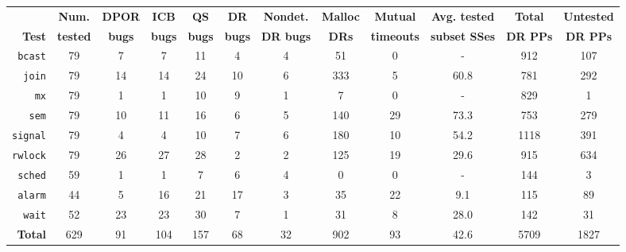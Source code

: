 
\begin{table}[t]
	\begin{center}
		\small
	\begin{tabular}{r|c||c|c|c|c|c|c||c|c||c|c}
		& {\bf Num.} & {\bf DPOR} & {\bf ICB} & {\bf QS} & {\bf DR} & {\bf Nondet.} & {\bf Malloc} & {\bf Mutual} & {\bf Avg. tested} & {\bf Total} & {\bf Untested} \\
		{\bf Test} & {\bf tested} & {\bf bugs} & {\bf bugs} & {\bf bugs} & {\bf bugs} & {\bf DR bugs} & {\bf DRs} & {\bf timeouts} & {\bf subset SSes} & {\bf DR PPs} & {\bf DR PPs} \\
		\hline
		{\tt bcast}	& 79	& 7	& 7	& 11	& 4	& 4	& 51	& 0	& -	& 912	& 107	\\
		{\tt join} 	& 79	& 14 	& 14	& 24	& 10	& 6	& 333	& 5	& 60.8	& 781	& 292	\\
		{\tt mx} 	& 79	& 1	& 1	& 10	& 9	& 1	& 7	& 0	& -	& 829	& 1	\\
		{\tt sem} 	& 79	& 10	& 11	& 16	& 6	& 5	& 140	& 29	& 73.3	& 753	& 279	\\
		{\tt signal} 	& 79	& 4	& 4	& 10	& 7	& 6	& 180	& 10	& 54.2	& 1118	& 391	\\
		{\tt rwlock} 	& 79	& 26	& 27	& 28	& 2	& 2	& 125	& 19	& 29.6	& 915	& 634	\\
		\hline
		{\tt sched} 	& 59	& 1	& 1	& 7	& 6	& 4	& 0	& 0	& -	& 144	& 3	\\
		{\tt alarm} 	& 44	& 5	& 16	& 21	& 17	& 3	& 35 	& 22	& 9.1	& 115	& 89	\\
		{\tt wait} 	& 52	& 23	& 23	& 30	& 7	& 1	& 31	& 8	& 28.0	& 142	& 31	\\
		\hline
		{\bf Total}	& 629	& 91	& 104	& 157	& 68	& 32	& 902	& 93	& 42.6 	& 5709	& 1827	\\
	\end{tabular}

\end{center}
\end{table}
